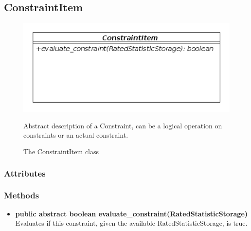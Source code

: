 \subsection{ConstraintItem}
\begin{figure}[htbp]
	\begin{minipage}[t]{8cm}
		\vspace{0pt}
		\centering
		\includegraphics[scale=0.6]{./diagram_pictures/reactor/ConstraintItem.png}
		\caption{The ConstraintItem class}
	\end{minipage}
	\hfill
	\begin{minipage}[t]{6.5cm}
		\vspace{10pt}
			Abstract description of a Constraint, can be a logical operation on constraints or an actual constraint.
	\end{minipage}
\end{figure}  


\subsubsection{Attributes}
\subsubsection{Methods}
\begin{itemize}
	\item \textbf{ public abstract boolean evaluate\_constraint(RatedStatisticStorage) }\\
	Evaluates if this constraint, given the available RatedStatisticStorage, is true. 
\end{itemize}		


\newpage
